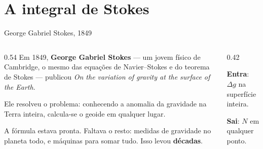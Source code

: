 \documentclass[aspectratio=169,11pt]{beamer}
\newcommand{\bnum}[1]{\textbf{\textcolor{mTeal}{#1}}}
\begin{document}
\section{A integral de Stokes}

\begin{frame}{George Gabriel Stokes, 1849}
  \begin{columns}[T]
    \begin{column}{0.54\textwidth}
      Em 1849, \textbf{George Gabriel Stokes} --- um jovem físico de Cambridge, o mesmo das
      equações de Navier--Stokes e do teorema de Stokes --- publicou \emph{On the variation
      of gravity at the surface of the Earth}.
      \medskip

      Ele resolveu o problema: \alert{conhecendo a anomalia da gravidade na Terra inteira,
      calcula-se o geoide em qualquer lugar.}
      \medskip

      A fórmula estava pronta. Faltava o resto: medidas de gravidade no planeta todo, e
      máquinas para somar tudo. Isso levou \bnum{décadas}.
    \end{column}
    \begin{column}{0.42\textwidth}
      \begin{regra}[title={O problema de Stokes, em uma linha}]
        \textbf{Entra}: $\Delta g$ na superfície inteira.
        \medskip

        \textbf{Sai}: $N$ em qualquer ponto.
      \end{regra}
    \end{column}
  \end{columns}
\end{frame}
\end{document}
